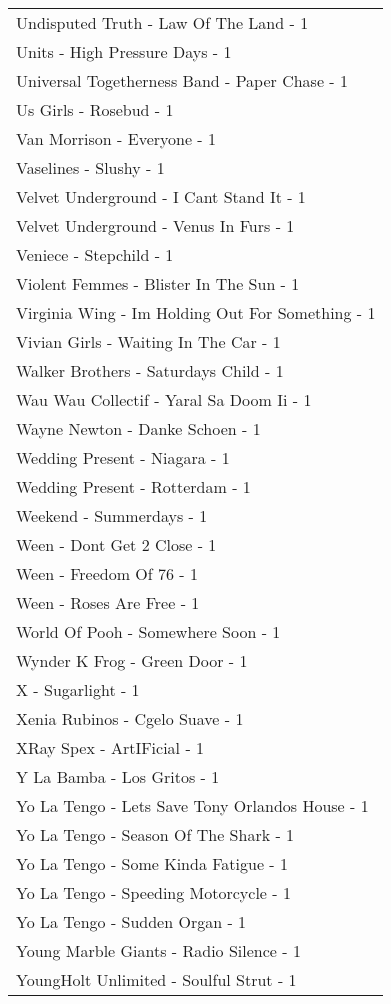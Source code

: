 \documentclass[
]{article}
\begin{document}
\begin{longtable}{l}
Undisputed Truth - Law Of The Land - 1 \\ 
Units - High Pressure Days - 1 \\ 
Universal Togetherness Band - Paper Chase - 1 \\ 
Us Girls - Rosebud - 1 \\ 
Van Morrison - Everyone - 1 \\ 
Vaselines - Slushy - 1 \\ 
Velvet Underground - I Cant Stand It - 1 \\ 
Velvet Underground - Venus In Furs - 1 \\ 
Veniece - Stepchild - 1 \\ 
Violent Femmes - Blister In The Sun - 1 \\ 
Virginia Wing - Im Holding Out For Something - 1 \\ 
Vivian Girls - Waiting In The Car - 1 \\ 
Walker Brothers - Saturdays Child - 1 \\ 
Wau Wau Collectif - Yaral Sa Doom Ii - 1 \\ 
Wayne Newton - Danke Schoen - 1 \\ 
Wedding Present - Niagara - 1 \\ 
Wedding Present - Rotterdam - 1 \\ 
Weekend - Summerdays - 1 \\ 
Ween - Dont Get 2 Close - 1 \\ 
Ween - Freedom Of 76 - 1 \\ 
Ween - Roses Are Free - 1 \\ 
World Of Pooh - Somewhere Soon - 1 \\ 
Wynder K Frog - Green Door - 1 \\ 
X - Sugarlight - 1 \\ 
Xenia Rubinos - Cgelo Suave - 1 \\ 
XRay Spex - ArtIFicial - 1 \\ 
Y La Bamba - Los Gritos - 1 \\ 
Yo La Tengo - Lets Save Tony Orlandos House - 1 \\ 
Yo La Tengo - Season Of The Shark - 1 \\ 
Yo La Tengo - Some Kinda Fatigue - 1 \\ 
Yo La Tengo - Speeding Motorcycle - 1 \\ 
Yo La Tengo - Sudden Organ - 1 \\ 
Young Marble Giants - Radio Silence - 1 \\ 
YoungHolt Unlimited - Soulful Strut - 1 \\ 

\end{longtable}
\end{document}
